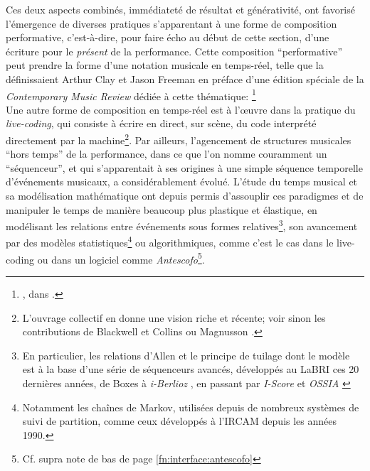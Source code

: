 \indent Ces deux aspects combinés, immédiateté de résultat et générativité, ont favorisé l'émergence de diverses pratiques s'apparentant à une forme de composition performative, c'est-à-dire, pour faire écho au début de cette section, d'une écriture pour le \textit{présent} de la performance. Cette composition ``performative'' peut prendre la forme d'une notation musicale en temps-réel, telle que la définissaient Arthur Clay et Jason Freeman en préface d'une édition spéciale de la \textit{Contemporary Music Review} dédiée à cette thématique: \footnote{, dans \cite{clay_preface_2010}.}\\
\indent Une autre forme de composition en temps-réel est à l'œuvre dans la pratique du \textit{live-coding}, qui consiste à écrire en direct, sur scène, du code interprété directement par la machine\footnote{L'ouvrage collectif \cite{mclean_oxford_2018} en donne une vision riche et récente; voir sinon les contributions de Blackwell et Collins \cite{blackwell_programming_2005} ou Magnusson \cite{magnusson_algorithms_2011}.}. Par ailleurs, l'agencement de structures musicales ``hors temps'' de la performance, dans ce que l'on nomme couramment un ``séquenceur'', et qui s'apparentait à ses origines à une simple séquence temporelle d'événements musicaux, a considérablement évolué. L'étude du temps musical et sa modélisation mathématique ont depuis permis d'assouplir ces paradigmes et de manipuler le temps de manière beaucoup plus plastique et élastique, en modélisant les relations entre événements sous formes relatives\footnote{En particulier, les relations d'Allen et le principe de tuilage \cite{berthaut_libtuile_2013} dont le modèle est à la base d'une série de séquenceurs avancés, développés au \gls{LaBRI} ces 20 dernières années, de Boxes à \textit{i-Berlioz} \cite{miranda_i-berlioz:_2019}, en passant par \textit{I-Score} \cite{desainte-catherine_interactive_2005} et \textit{OSSIA} \cite{celerier_ossia:_2015}}, son avancement par des modèles statistiques\footnote{Notamment les chaînes de Markov, utilisées depuis de nombreux systèmes de suivi de partition, comme ceux développés à l'\gls{IRCAM} depuis les années 1990.} ou algorithmiques, comme c'est le cas dans le live-coding ou dans un logiciel comme \textit{Antescofo}\footnote{Cf. supra note de bas de page \ref{fn:interface:antescofo}}.\\
